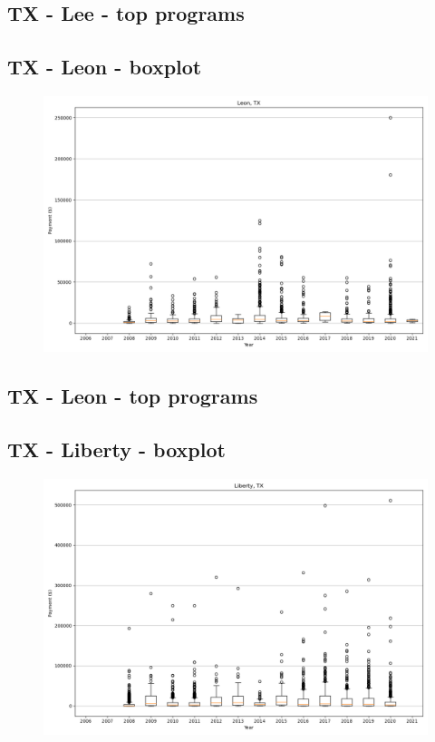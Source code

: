 \subsection*{TX - Lee - top programs}

\newpage
\subsection*{TX - Leon - boxplot}
\begin{figure}[h]
\centering
\includegraphics[width=7in]{../output/boxplots/counties/Leon-TX_boxplot.png}
\end{figure}


\subsection*{TX - Leon - top programs}

\newpage
\subsection*{TX - Liberty - boxplot}
\begin{figure}[h]
\centering
\includegraphics[width=7in]{../output/boxplots/counties/Liberty-TX_boxplot.png}
\end{figure}


